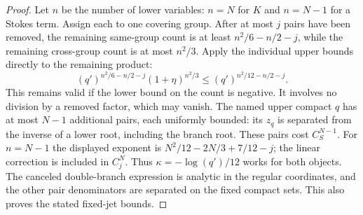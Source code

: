 \documentclass[11pt]{article}
\numberwithin{equation}{section}
\theoremstyle{definition}
\begin{document}
\begin{proof}
Let \(n\) be the number of lower variables: \(n=N\) for \(K\)
and \(n=N-1\) for a Stokes term. Assign each to one covering group.
After at most \(j\) pairs have been removed, the remaining
same-group count is at least \(n^2/6-n/2-j\), while the
remaining cross-group count is at most \(n^2/3\). Apply the
individual upper bounds directly to the remaining product:
\[
 (q')^{n^2/6-n/2-j}(1+\eta)^{n^2/3}
       \le(q')^{n^2/12-n/2-j}.
\]
This remains valid if the lower bound on the count is negative.
It involves no division by a removed factor, which may vanish.
The named upper compact
\(q\) has at most \(N-1\) additional pairs, each uniformly
bounded: its \(z_q\) is separated from the inverse of a lower
root, including the branch root. These pairs cost \(C_S^{N-1}\).
For \(n=N-1\) the displayed exponent is
\(N^2/12-2N/3+7/12-j\); the linear correction is included in
\(C_j^N\). Thus \(\kappa=-\log(q')/12\) works for both objects.
The canceled double-branch expression is analytic in the regular
coordinates, and the other pair denominators are separated on the
fixed compact sets. This also proves the stated fixed-jet bounds.
\end{proof}
\end{document}
